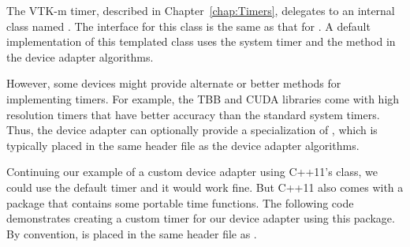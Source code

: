 The VTK-m timer, described in Chapter~\ref{chap:Timers}, delegates to an
internal class named . The
interface for this class is the same as that for . A default
implementation of this templated class uses the system timer and the
 method in the device adapter algorithms.

However, some devices might provide alternate or better methods for
implementing timers. For example, the TBB and CUDA libraries come with high
resolution timers that have better accuracy than the standard system
timers. Thus, the device adapter can optionally provide a specialization of
, which is typically
placed in the same header file as the device adapter algorithms.

Continuing our example of a custom device adapter using C++11's
 class, we could use the default timer and it would
work fine. But C++11 also comes with a  package that
contains some portable time functions. The following code demonstrates
creating a custom timer for our device adapter using this package. By
convention,  is placed in
the same header file as .



